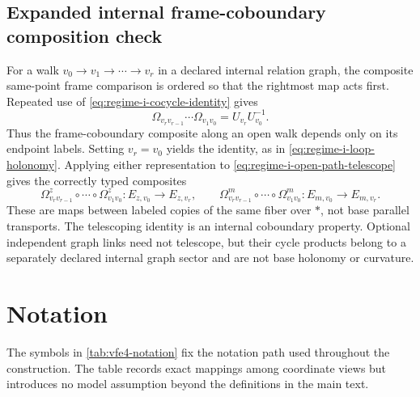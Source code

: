 \section{Expanded internal frame-coboundary composition check}

For a walk $v_0\to v_1\to\cdots\to v_r$ in a declared internal relation graph, the composite same-point frame comparison is ordered so that the rightmost map acts first. Repeated use of \cref{eq:regime-i-cocycle-identity} gives
\begin{equation}
\Omega_{v_rv_{r-1}}\cdots\Omega_{v_1v_0}
=U_{v_r}U_{v_0}^{-1}.
\label{eq:regime-i-open-path-telescope}
\end{equation}
Thus the frame-coboundary composite along an open walk depends only on its endpoint labels. Setting $v_r=v_0$ yields the identity, as in \cref{eq:regime-i-loop-holonomy}. Applying either representation to \cref{eq:regime-i-open-path-telescope} gives the correctly typed composites
\begin{equation}
\Omega^z_{v_rv_{r-1}}\circ\cdots\circ\Omega^z_{v_1v_0}
:E_{z,v_0}\longrightarrow E_{z,v_r},
\qquad
\Omega^m_{v_rv_{r-1}}\circ\cdots\circ\Omega^m_{v_1v_0}
:E_{m,v_0}\longrightarrow E_{m,v_r}.
\label{eq:associated-open-path-types}
\end{equation}
These are maps between labeled copies of the same fiber over $\ast$, not base parallel transports. The telescoping identity is an internal coboundary property. Optional independent graph links need not telescope, but their cycle products belong to a separately declared internal graph sector and are not base holonomy or curvature.

\chapter{Notation}

The symbols in \cref{tab:vfe4-notation} fix the notation path used throughout the construction. The table records exact mappings among coordinate views but introduces no model assumption beyond the definitions in the main text.

